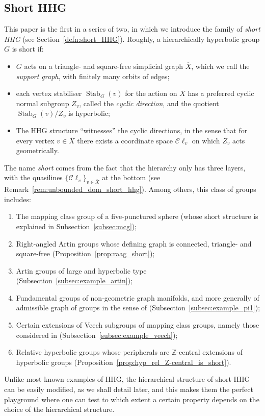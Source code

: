 \documentclass[svgnames]{amsart}
\theoremstyle{plain}
\theoremstyle{definition}
\newcommand{\Z}{\mathbb{Z}}
\newcommand{\C}{\mathcal C}
\newcommand{\ov}[1]{\overline{#1}}
\newcommand{\Stab}[2]{\operatorname{Stab}_{#1}(#2)}
\begin{document}
\subsection*{Short HHG}
This paper is the first in a series of two, in which we introduce the family of \emph{short HHG} (see Section~\ref{defn:short_HHG}). Roughly, a hierarchically hyperbolic group $G$ is short if:
\begin{itemize}
    \item $G$ acts on a triangle- and square-free simplicial graph $\ov X$, which we call the \emph{support graph}, with finitely many orbits of edges;
    \item each vertex stabiliser $\Stab{G}{v}$ for the action on $\ov X$ has a preferred cyclic normal subgroup $Z_v$, called the \emph{cyclic direction}, and the quotient $\Stab{G}{v}/Z_v$ is hyperbolic;
    \item The HHG structure “witnesses” the cyclic directions, in the sense that for every vertex $v\in\ov X$ there exists a coordinate space $\C\ell_v$ on which $Z_v$ acts geometrically. 
\end{itemize} The name \emph{short} comes from the fact that the hierarchy only has three layers, with the quasilines $\{\C\ell_v\}_{v\in\ov X}$ at the bottom (see Remark~\ref{rem:unbounded_dom_short_hhg}). Among others, this class of groups includes:
\begin{enumerate}[label=(\alph*)]
    \item \label{item:listfirst} The mapping class group of a five-punctured sphere (whose short structure is explained in Subsection~\ref{subsec:mcg});
    \item Right-angled Artin groups whose defining graph is connected, triangle- and square-free  (Proposition~\ref{prop:raag_short});
    \item Artin groups of large and hyperbolic type (Subsection~\ref{subsec:example_artin});
    \item Fundamental groups of non-geometric graph manifolds, and more generally of admissible graph of groups in the sense of \cite{croke-Kleiner} (Subsection~\ref{subsec:example_pi1});
    \item Certain extensions of Veech subgroups of mapping class groups, namely those considered in \cite{veech,bongiovanni2024extensions} (Subsection~\ref{subsec:example_veech});
    \item \label{item:listlast}  Relative hyperbolic groups whose peripherals are $\Z$-central extensions of hyperbolic groups (Proposition~\ref{prop:hyp_rel_Z-central_is_short}).
\end{enumerate}
Unlike most known examples of HHG, the hierarchical structure of short HHG can be easily modified, as we shall detail later, and this makes them the perfect playground where one can test to which extent a certain property depends on the choice of the hierarchical structure. 
\end{document}
